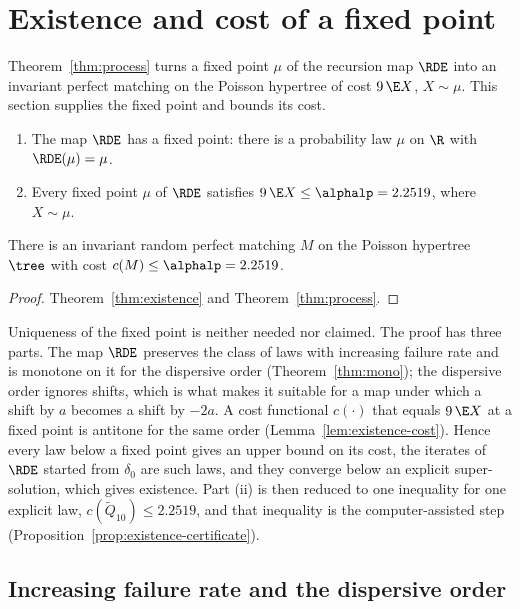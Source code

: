 \section{Existence and cost of a fixed point}\label{sec:existence}

Theorem~\ref{thm:process} turns a fixed point $\mu$ of the recursion map $\RDE$ into an
invariant perfect matching on the Poisson hypertree of cost $9\,\E X$, $X\sim\mu$. This
section supplies the fixed point and bounds its cost.

\begin{theorem}\label{thm:existence}
\begin{enumerate}
\item[(i)] The map $\RDE$ has a fixed point: there is a probability law $\mu$ on $\R$ with
$\RDE(\mu)=\mu$.
\item[(ii)] Every fixed point $\mu$ of $\RDE$ satisfies $9\,\E X\le\alphalp=2.2519$, where
$X\sim\mu$.
\end{enumerate}
\end{theorem}

\begin{corollary}\label{cor:existence-matching}
There is an invariant random perfect matching $M$ on the Poisson hypertree $\tree$ with cost
$c(M)\le\alphalp=2.2519$.
\end{corollary}

\begin{proof}
Theorem~\ref{thm:existence} and Theorem~\ref{thm:process}.
\end{proof}

Uniqueness of the fixed point is neither needed nor claimed. The proof has three parts. The
map $\RDE$ preserves the class of laws with increasing failure rate and is monotone on it for
the dispersive order (Theorem~\ref{thm:mono}); the dispersive order ignores shifts, which is
what makes it suitable for a map under which a shift by $a$ becomes a shift by $-2a$. A cost
functional $c(\cdot)$ that equals $9\,\E X$ at a fixed point is antitone for the same order
(Lemma~\ref{lem:existence-cost}). Hence every law below a fixed point gives an upper bound on
its cost, the iterates of $\RDE$ started from $\delta_0$ are such laws, and they converge
below an explicit super-solution, which gives existence. Part (ii) is then reduced to one
inequality for one explicit law, $c(\tilde Q_{10})\le2.2519$, and that inequality is the
computer-assisted step (Proposition~\ref{prop:existence-certificate}).

\subsection{Increasing failure rate and the dispersive order}\label{subsec:existence-ifr}

